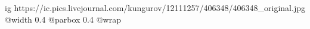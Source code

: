  
 
 
 
 

\ifcmt
  ig https://ic.pics.livejournal.com/kungurov/12111257/406348/406348_original.jpg
  @width 0.4
  @parbox 0.4
  @wrap \parpic[r]
\fi
